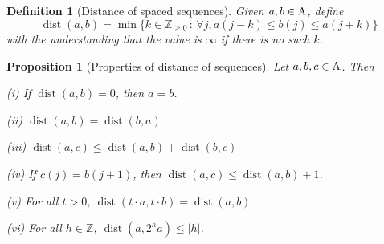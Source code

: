 \documentclass[12pt,reqno]{amsart}
\theoremstyle{plain}
\newtheorem{proposition}[theorem]{Proposition}
\newtheorem{definition}[theorem]{Definition}
\numberwithin{equation}{section}
\theoremstyle{remark}
\DeclareMathOperator{\dist}{dist}
\begin{document}
\begin{definition}[Distance of spaced sequences]\label{Distance of spaced sequences}
Given $a,b\in {\rm A}$, define
\begin{equation}\label{auto:spaced-sequence-distance}
    \dist(a,b)=\min\{k\in\mathbb{Z}_{\ge 0}\,:\,\forall j, a(j-k)\le b(j)\le a(j+k)\}
\end{equation}
with the understanding that the value is $\infty$ if there is no such $k$.
\end{definition}

\begin{proposition}[Properties of distance of sequences]\label{Properties of distance of sequences}
    Let $a,b,c\in {\rm A}$.
    Then

    (i) If $\dist(a,b)=0$, then $a=b$.

    (ii) $\dist(a,b)=\dist(b,a)$

    (iii) $\dist(a,c)\le \dist(a,b)+\dist(b,c)$

    (iv) If $c(j)=b(j+1)$, then $\dist(a,c)\le \dist(a,b)+1$.

    (v) For all $t>0$, $\dist(t\cdot a,t\cdot b)=\dist(a,b)$

    (vi) For all $h\in\mathbb{Z}$,
    $\dist(a,2^h a)\le |h|$.
\end{proposition}
\end{document}
